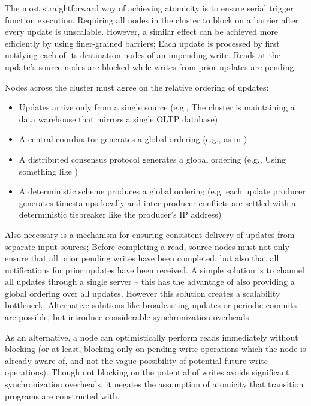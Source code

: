 The most straightforward way of achieving atomicity is to ensure serial trigger function execution.  Requiring all nodes in the cluster to block on a barrier after every update is unscalable.  However, a similar effect can be achieved more efficiently by using finer-grained barriers; Each update is processed by first notifying each of its destination nodes of an impending write.  Reads at the update's source nodes are blocked while writes from prior updates are pending.

Nodes across the cluster must agree on the relative ordering of updates:
\begin{itemize}
\item Updates arrive only from a single source (e.g., The cluster is maintaining a data warehouse that mirrors a single OLTP database)
\item A central coordinator generates a global ordering (e.g., as in \cite{peng-incremental:10})
\item A distributed consensus protocol generates a global ordering (e.g., Using something like \cite{Junqueira:2009:LTZ:1582716.1582721})
\item A deterministic scheme produces a global ordering (e.g. each update producer generates timestamps locally and inter-producer conflicts are settled with a deterministic tiebreaker like the producer's IP address)
\end{itemize}

Also necessary is a mechanism for ensuring consistent delivery of updates from separate input sources; Before completing a read, source nodes must not only ensure that all prior pending writes have been completed, but also that all notifications for prior updates have been received.  A simple solution is to channel all updates through a single server -- this has the advantage of also providing a global ordering over all updates.  However this solution creates a scalability bottleneck.  Alternative solutions like broadcasting updates or periodic commits are possible, but introduce considerable synchronization overheads.

As an alternative, a node can optimistically perform reads immediately without blocking (or at least, blocking only on pending write operations which the node is already aware of, and not the vague possibility of potential future write operations).  Though not blocking on the potential of writes avoids significant synchronization overheads, it negates the assumption of atomicity that transition programs are constructed with.  


